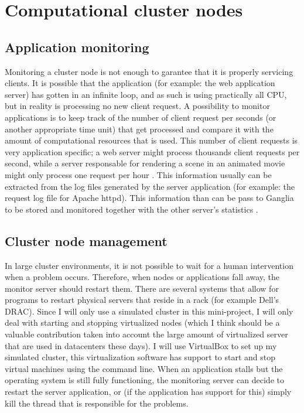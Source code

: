 \documentclass[12pt]{report}
\begin{document}
\section{Computational cluster nodes}
\subsection{Application monitoring}
Monitoring a cluster node is not enough to garantee that it is
properly servicing clients. It is possible that the application (for
example: the web application server) has gotten in an infinite loop,
and as such is using practically all CPU, but in reality is
processing no new client request.
A possibility to monitor applications is to keep track of the number of
client request per seconds (or another appropriate time unit) that get
processed and compare it with the amount of computational resources
that is used.
This number of client requests is very application specific; a web
server might process thousands client requests per second, while a
server responsable for rendering a scene in an animated movie might only process
one request per hour \cite{apm:2013}.
This information usually can be extracted from the log files generated
by the server application (for example: the request log file for
Apache httpd). This information than can be pass to Ganglia to be
stored and monitored together with the other server's statistics
\cite{ganglia:2013}.

\subsection{Cluster node management}
In large cluster environments, it is not possible to wait for
a human intervention when a problem occurs. Therefore, when nodes or
applications fall away, the monitor server should restart them.
There are several systems that allow for programs to restart
physical servers that reside in a rack (for example Dell's DRAC).
Since I will only use a simulated cluster in this mini-project, I will
only deal with starting and stopping virtualized nodes (which I think should
be a valuable contribution taken into account the large amount of
virtualized server that are used in datacenters these days).
I will use VirtualBox to set up my simulated cluster, this
virtualization software has support to start and stop virtual machines
using the command line.
When an application stalls but the operating system is still fully
functioning, the monitoring server can decide to restart the server application, or
(if the application has support for this) simply kill the thread that
is responsible for the problems.
\end{document}
